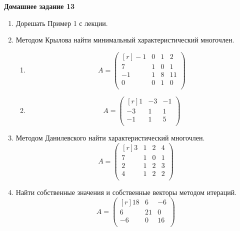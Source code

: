 \documentclass[12pt]{article}
\theoremstyle{definition}
\numberwithin{equation}{section}
\begin{document}
\textbf{Домашнее задание 13}\begin{enumerate}
\item Дорешать Пример 1 с лекции.
\item Методом Крылова найти минимальный характеристический многочлен.
\begin{enumerate}
    \item \[A = \begin{pmatrix}[r]
-1 & 0 & 1 & 2\\
7 & 1 & 0 & 1\\
-1 & 1 & 8 & 11\\
0 & 0 & 1 & 0\\
\end{pmatrix}\]
    \item \[A = \begin{pmatrix}[r]
1 & -3 & -1\\
-3 & 1 & 1\\
-1 & 1 & 5\\
\end{pmatrix}\]
\end{enumerate}
\item Методом Данилевского найти характеристический многочлен.
\[A = \begin{pmatrix}[r]
3 & 1 & 2 & 4\\
7 & 1 & 0 & 1\\
2 & 1 & 2 & 3\\
4 & 1 & 2 & 2\\
\end{pmatrix}\]
\item Найти собственные значения и собственные векторы методом итераций.
\[A = \begin{pmatrix}[r]
18 & 6 & -6\\
6 & 21 & 0\\
-6 & 0 & 16\\
\end{pmatrix}\]
\end{enumerate}
~\\
\end{document}
